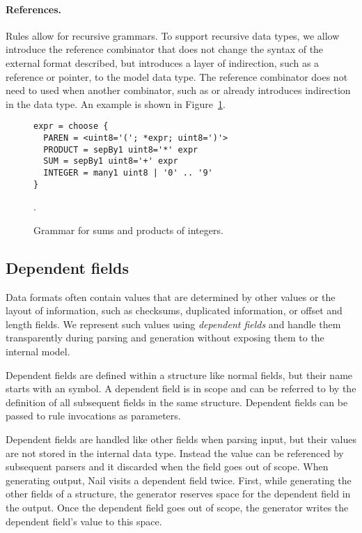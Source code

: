 \paragraph{References.}
Rules allow for recursive grammars. To support recursive data types, we allow introduce the
reference combinator \cc{*}  that does not change the syntax of the external format described, but
introduces a layer of indirection, such as a reference or pointer, to the model data type.
The reference combinator does not need to used when another combinator, such as  or
 already introduces indirection in the data type. An example is shown in Figure~\ref{fig:grammar-arith}.

\begin{figure}
\begin{verbatim}
expr = choose {
  PAREN = <uint8='('; *expr; uint8=')'>
  PRODUCT = sepBy1 uint8='*' expr
  SUM = sepBy1 uint8='+' expr
  INTEGER = many1 uint8 | '0' .. '9'
}
\end{verbatim} .
\label{fig:grammar-arith}
\caption{Grammar for sums and products of integers.}
\end{figure}



\subsection{Dependent fields}
\label{s:dependent}
Data formats often contain values that are determined by other values or the layout of information,
such as checksums, duplicated information, or offset and  length fields.
We represent such values using \emph{dependent fields} and handle them transparently during
parsing and generation without exposing them to the internal model. 


Dependent fields are defined within a structure like normal fields, but their name starts with an  symbol.
A dependent field is in scope and can be referred to by the definition of all subsequent fields in
the same structure. Dependent fields can be passed to rule invocations as parameters.

Dependent fields are handled like other fields when parsing input, but their values are not stored
in the internal data type. Instead the value can be referenced by subsequent parsers and it
discarded when the field goes out of scope.
When generating output, Nail visits a dependent field twice. First, while generating the other fields of a
structure, the generator reserves space for the dependent field in the output. Once
the dependent field goes out of scope, the generator  writes the
dependent field's value to this space.

